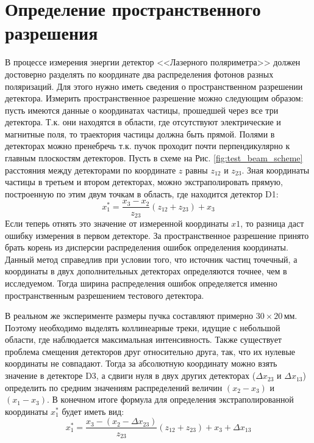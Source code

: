 \section{Определение пространственного разрешения}
В процессе измерения энергии детектор  <<Лазерного поляриметра>> должен достоверно разделять по координате два распределения фотонов разных поляризаций. Для этого нужно иметь сведения о пространственном разрешении детектора. Измерить пространственное разрешение можно следующим образом: пусть имеются данные о координатах частицы, прошедшей через все три детектора. Т.к. они находятся в области, где отсутствуют электрические и магнитные поля, то траектория частицы должна быть прямой. Полями в детекторах можно пренебречь т.к. пучок проходит почти перпендикулярно к главным плоскостям детекторов. Пусть в схеме на Рис. \ref{fig:test_beam_scheme} расстояния между детекторами по координате $z$ равны $z_{12}$ и $z_{23}$. Зная координаты частицы в третьем и втором детекторах, можно экстраполировать прямую, построенную по этим двум точкам в область, где находится детектор D1: 
\begin{equation}
	x_{1}^{*} = \frac{x_3- x_2}{z_{23}}(z_{12}+z_{23})+ x_3
\end{equation} 
Если теперь отнять это значение от измеренной координаты $x1$, то разница даст ошибку измерения  в первом детекторе. За пространственное разрешение принято брать корень из дисперсии распределения ошибок определения координаты. Данный метод справедлив при условии того, что источник частиц точечный, а координаты в двух дополнительных детекторах определяются точнее, чем в исследуемом. Тогда ширина распределения ошибок определяется именно пространственным разрешением тестового детектора.
\par В реальном же эксперименте размеры пучка составляют примерно $30\times 20$\,мм. Поэтому необходимо выделять коллинеарные треки, идущие с небольшой области, где наблюдается максимальная интенсивность. Также существует проблема смещения детекторов друг относительно друга, так, что их нулевые координаты не совпадают. Тогда за абсолютную координату можно взять значение в детекторе D3, а сдвиги нуля в двух других детекторах ($\Delta x_{23}$ и $\Delta x_{13}$) определить по средним значениям распределений величин $(x_2 - x_3)$ и $(x_1 - x_3)$. В конечном итоге формула для определения экстраполированной координаты $	x_{1}^{*}$ будет иметь вид: 
\begin{equation}
x_{1}^{*} = \frac{x_3- (x_2 -\Delta x_{23}) }{z_{23}}(z_{12}+z_{23})+ x_3 + \Delta x_{13}
\label{eq:sp_res_x}
\end{equation} 
